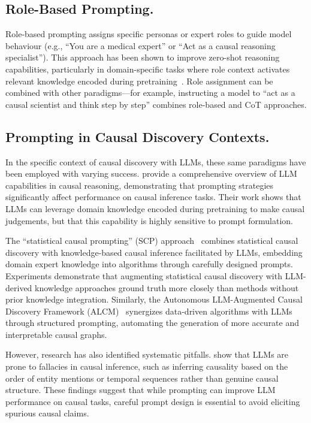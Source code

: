 \subsection{Role-Based Prompting.}
Role-based prompting assigns specific personas or expert roles to guide model behaviour (e.g., ``You are a medical expert'' or ``Act as a causal reasoning specialist''). This approach has been shown to improve zero-shot reasoning capabilities, particularly in domain-specific tasks where role context activates relevant knowledge encoded during pretraining~\citep{kong2024betterzeroshotreasoningroleplay, ruangtanusak2025talklessrightenhancing}. Role assignment can be combined with other paradigms---for example, instructing a model to ``act as a causal scientist and think step by step'' combines role-based and CoT approaches.

\subsection{Prompting in Causal Discovery Contexts.}

In the specific context of causal discovery with LLMs, these same paradigms have been employed with varying success. \citet{kiciman2024causal} provide a comprehensive overview of LLM capabilities in causal reasoning, demonstrating that prompting strategies significantly affect performance on causal inference tasks. Their work shows that LLMs can leverage domain knowledge encoded during pretraining to make causal judgements, but that this capability is highly sensitive to prompt formulation.

The ``statistical causal prompting'' (SCP) approach~\citep{takayama2025scp} combines statistical causal discovery with knowledge-based causal inference facilitated by LLMs, embedding domain expert knowledge into algorithms through carefully designed prompts. Experiments demonstrate that augmenting statistical causal discovery with LLM-derived knowledge approaches ground truth more closely than methods without prior knowledge integration. Similarly, the Autonomous LLM-Augmented Causal Discovery Framework (ALCM)~\citep{khatibi2025alcm} synergizes data-driven algorithms with LLMs through structured prompting, automating the generation of more accurate and interpretable causal graphs.

However, research has also identified systematic pitfalls. \citet{joshi2024causalfallacies} show that LLMs are prone to fallacies in causal inference, such as inferring causality based on the order of entity mentions or temporal sequences rather than genuine causal structure. These findings suggest that while prompting can improve LLM performance on causal tasks, careful prompt design is essential to avoid eliciting spurious causal claims.

